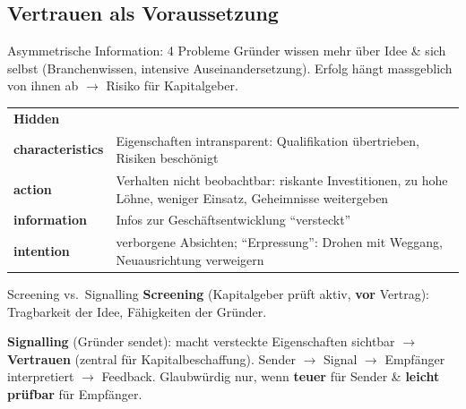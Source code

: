 \documentclass[a4paper, fontsize=7pt]{scrartcl}
\renewcommand*{\arraystretch}{1.5}  %
\begin{document}
\subsection{Vertrauen als Voraussetzung}

\begin{mainbox}{Asymmetrische Information: 4 Probleme}
Gründer wissen mehr über Idee \& sich selbst (Branchenwissen, intensive
Auseinandersetzung). Erfolg hängt massgeblich von ihnen ab $\to$ Risiko für
Kapitalgeber.
\renewcommand*{\arraystretch}{1.2}
\begin{tabularx}{\linewidth}{@{}lX@{}}
\textbf{Hidden} & \\
\textbf{characteristics} & Eigenschaften intransparent: Qualifikation
übertrieben, Risiken beschönigt \\
\textbf{action} & Verhalten nicht beobachtbar: riskante Investitionen, zu
hohe Löhne, weniger Einsatz, Geheimnisse weitergeben \\
\textbf{information} & Infos zur Geschäftsentwicklung ``versteckt'' \\
\textbf{intention} & verborgene Absichten; ``Erpressung'': Drohen mit
Weggang, Neuausrichtung verweigern \\
\end{tabularx}
\end{mainbox}

\begin{mainbox}{Screening vs.\ Signalling}
\textbf{Screening} (Kapitalgeber prüft aktiv, \textbf{vor} Vertrag):
Tragbarkeit der Idee, Fähigkeiten der Gründer.

\textbf{Signalling} (Gründer sendet): macht versteckte Eigenschaften sichtbar
$\to$ \textbf{Vertrauen} (zentral für Kapitalbeschaffung). Sender $\to$ Signal
$\to$ Empfänger interpretiert $\to$ Feedback. Glaubwürdig nur, wenn
\textbf{teuer} für Sender \& \textbf{leicht prüfbar} für Empfänger.
\end{mainbox}
\end{document}
